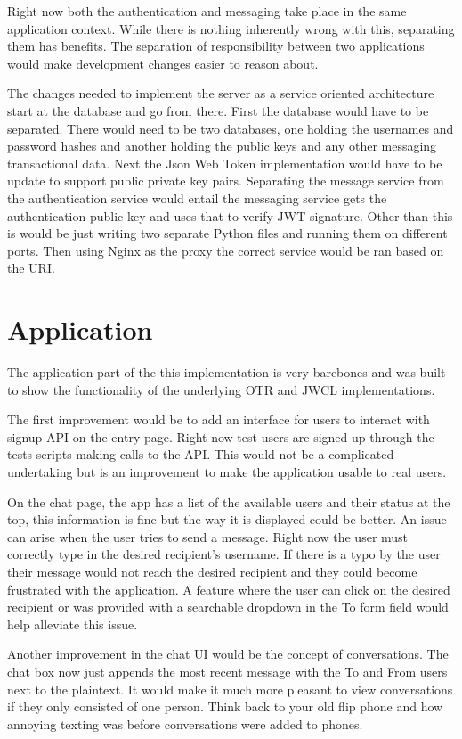 Right now both the authentication and messaging take place in the same application context. While there is nothing inherently wrong with this, separating them has benefits. The separation of responsibility between two applications would make development changes easier to reason about. 


The changes needed to implement the server as a service oriented architecture start at the database and go from there. First the database would have to be separated. There would need to be two databases, one holding the usernames and password hashes and another holding the public keys and any other messaging transactional data. Next the Json Web Token implementation would have to be update to support public private key pairs. Separating the message service from the authentication service would entail the messaging service gets the authentication public key and uses that to verify JWT signature. Other than this is would be just writing two separate Python files and running them on different ports. Then using Nginx as the proxy the correct service would be ran based on the URI. 


\section{Application}


The application part of the this implementation is very barebones and was built to show the functionality of the underlying OTR and JWCL implementations. 


The first improvement would be to add an interface for users to interact with signup API on the entry page. Right now test users are signed up through the tests scripts making calls to the API. This would not be a complicated undertaking but is an improvement to make the application usable to real users.


On the chat page, the app has a list of the available users and their status at the top, this information is fine but the way it is displayed could be better. An issue can arise when the user tries to send a message. Right now the user must correctly type in the desired recipient's username. If there is a typo by the user their message would not reach the desired recipient and they could become frustrated with the application. A feature where the user can click on the desired recipient or was provided with a searchable dropdown in the To form field would help alleviate this issue.


Another improvement in the chat UI would be the concept of conversations. The chat box now just appends the most recent message with the To and From users next to the plaintext. It would make it much more pleasant to view conversations if they only consisted of one person. Think back to your old flip phone and how annoying texting was before conversations were added to phones.


